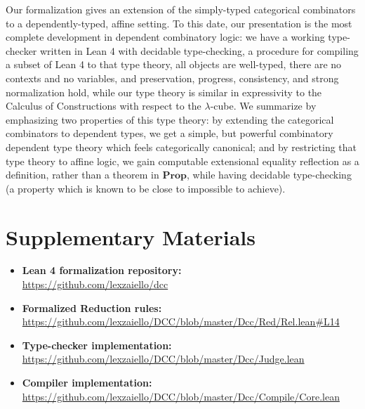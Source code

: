 \documentclass{lmcs}
\begin{document}
Our formalization gives an extension of the simply-typed categorical combinators \autocite[p. 220]{CURIEN1986188} to a dependently-typed, affine setting. To this date, our presentation is the most complete development in dependent combinatory logic: we have a working type-checker written in Lean 4 with decidable type-checking, a procedure for compiling a subset of Lean 4 to that type theory, all objects are well-typed, there are no contexts and no variables, and preservation, progress, consistency, and strong normalization hold, while our type theory is similar in expressivity to the Calculus of Constructions with respect to the \(\lambda\)-cube. We summarize by emphasizing two properties of this type theory: by extending the categorical combinators to dependent types, we get a simple, but powerful combinatory dependent type theory which feels categorically canonical; and by restricting that type theory to affine logic, we gain computable extensional equality reflection as a definition, rather than a theorem in \(\textbf{Prop}\), while having decidable type-checking (a property which is known to be close to impossible to achieve).

\appendix
\section{Supplementary Materials}\label{appendix:sup}

\begin{itemize}
  \item \textbf{Lean 4 formalization repository:}\\
  \href{https://github.com/lexzaiello/dcc}{https://github.com/lexzaiello/dcc}
  \item \textbf{Formalized Reduction rules:}\\
    \href{https://github.com/lexzaiello/DCC/blob/master/Dcc/Red/Rel.lean#L14}{https://github.com/lexzaiello/DCC/blob/master/Dcc/Red/Rel.lean\#L14}
  \item \textbf{Type-checker implementation:}\\
    \href{https://github.com/lexzaiello/DCC/blob/master/Dcc/Judge.lean}{https://github.com/lexzaiello/DCC/blob/master/Dcc/Judge.lean}
  \item \textbf{Compiler implementation:}\\
    \href{https://github.com/lexzaiello/DCC/blob/master/Dcc/Compile/Core.lean}{https://github.com/lexzaiello/DCC/blob/master/Dcc/Compile/Core.lean}
\end{itemize}

\printbibliography
\end{document}
